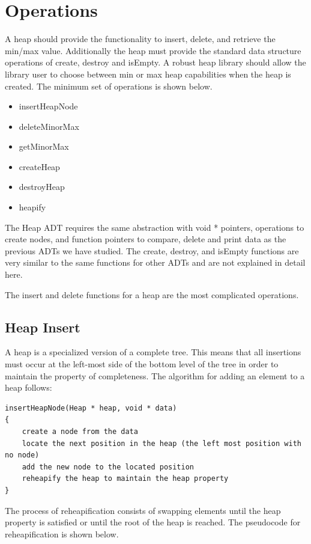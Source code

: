 \section{Operations}
A heap should provide the functionality to insert, delete, and retrieve the min/max value.    Additionally the heap must provide the standard data structure operations of create, destroy and isEmpty.   A robust heap library should allow the library user to choose between min or max heap capabilities when the heap is created.  The minimum set of operations is shown below.  

\begin{itemize}
\item insertHeapNode
\item deleteMinorMax
\item getMinorMax
\item createHeap
\item destroyHeap
\item heapify
\end{itemize}

The Heap ADT requires the same abstraction with void * pointers,   operations to create nodes,  and function pointers to compare, delete and print data as the previous ADTs we have studied.     The create, destroy, and isEmpty functions are very similar to the same functions for other ADTs and are not explained in detail here.

The insert and delete functions for a heap are the most complicated operations.   

\subsection{Heap Insert}

A heap is a specialized version of a complete tree.  This means that all insertions must occur at the left-most side of the bottom level of the tree in order to maintain the property of completeness.   The algorithm for adding an element to a heap follows:
\begin{lstlisting}
insertHeapNode(Heap * heap, void * data)
{
    create a node from the data
    locate the next position in the heap (the left most position with no node)
    add the new node to the located position
    reheapify the heap to maintain the heap property
}
\end{lstlisting}

The process of reheapification consists of swapping elements until the heap property is satisfied or until the root of the heap is reached.  The pseudocode for reheapification is shown below.

